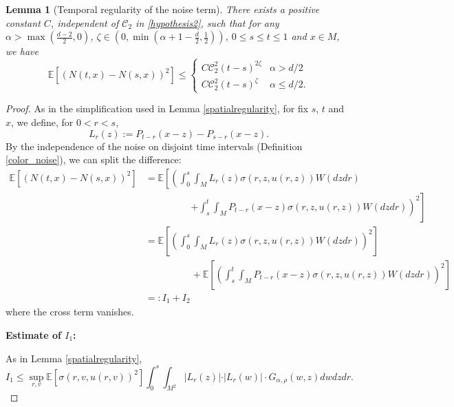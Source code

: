 \documentclass[12pt]{amsart}
\newtheorem{lemma}{Lemma}[section]
\numberwithin{equation}{section}
\newcommand{\1}{\mathbf{1}}
\begin{document}
\begin{lemma}[Temporal regularity of the noise term]\label{temporalregularity} There exists a positive constant $C$, independent of $\mathcal{C}_2$ in \eqref{hypothesis2}, such that for any $\alpha>\max\left(\frac{d-2}{2},0\right)$, $\zeta\in\left(0,\min\left(\alpha+1-\frac{d}{2},\frac{1}{2}\right)\right)$, $0\leq s\leq t\leq 1$ and $x\in M$, we have
\begin{equation*}
\mathbb{E}\left[(N(t,x)-N(s,x))^2\right]\leq\begin{cases}
    C\mathcal{C}_2^2(t-s)^{2\zeta}&\alpha>d/2\\
    C\mathcal{C}_2^2(t-s)^{\zeta} &\alpha\leq d/2.
    \end{cases}
\end{equation*}
\end{lemma}
\begin{proof}
As in the simplification used in Lemma \ref{spatialregularity}, for fix $s$, $t$ and $x$, we define, for $0<r<s$,
\begin{equation*}
L_r(z):=P_{t-r}(x-z)-P_{s-r}(x-z).
\end{equation*}
By the independence of the noise on disjoint time intervals (Definition \ref{color_noise}), we can split the difference:
\begin{equation*}
\begin{split}
\mathbb{E}[(N(t,x)-N(s,x))^2]&=\mathbb{E}\left[\left(\int_0^s\int_{M}L_r(z)\sigma(r,z,u(r,z))W(dzdr)\right.\right.\\
&\hspace{2cm}\left.\left.+\int_s^t\int_{M}P_{t-r}(x-z)\sigma(r,z,u(r,z))W(dzdr)\right)^2\right]\\
&=\mathbb{E}\left[\left(\int_0^s\int_{M}L_r(z)\sigma(r,z,u(r,z))W(dzdr)\right)^2\right]\\
&\hspace{2cm}+\mathbb{E}\left[\left(\int_s^t\int_{M}P_{t-r}(x-z)\sigma(r,z,u(r,z))W(dzdr)\right)^2\right]\\
&=:I_1+I_2
\end{split}
\end{equation*}
where the cross term vanishes.

\textbf{Estimate of $I_1$:}

As in Lemma \ref{spatialregularity},
\begin{equation*}
I_1\leq \sup_{r,v}\mathbb{E}\left[\sigma(r,v,u(r,v))^2\right]\int_0^s\int_{M^2}\vert L_r(z)\vert\cdot \vert L_r(w)\vert\cdot G_{\alpha,\rho}(w,z)dwdzdr.
\end{equation*}


\end{proof}
\end{document}
